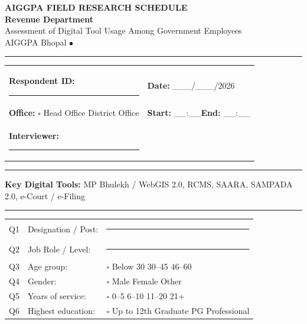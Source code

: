 \documentclass[10pt,a4paper]{article}
\newcommand{\blank}{\rule{8cm}{0.4pt}}
\begin{document}
\begin{center}
{\Large\bfseries AIGGPA FIELD RESEARCH SCHEDULE}\\[3pt]
{\large\bfseries Revenue Department}\\[3pt]
{\small Assessment of Digital Tool Usage Among Government Employees}\\[2pt]
{\small AIGGPA Bhopal \quad$\bullet$}
\end{center}
\vspace{4pt}\noindent\rule{\textwidth}{1pt}\vspace{4pt}
\noindent\begin{tabularx}{\textwidth}{@{}L{7cm} L{7cm}@{}}
\textbf{Respondent ID:} \blank & \textbf{Date:} \_\_\_/\_\_\_/2026 \\[3pt]
\textbf{Office:} {\Large$\square$} Head Office\quad{\Large$\square$} District Office & \textbf{Start:} \_\_:\_\_\quad\textbf{End:} \_\_:\_\_ \\[3pt]
\textbf{Interviewer:} \blank & \\
\end{tabularx}
\vspace{4pt}\noindent\rule{\textwidth}{0.5pt}\vspace{4pt}

\noindent\textbf{Key Digital Tools:} MP Bhulekh / WebGIS 2.0, RCMS, SAARA, SAMPADA 2.0, e-Court / e-Filing

\vspace{3pt}

\vspace{4pt}\noindent\rule{\textwidth}{0.5pt}

\vspace{3pt}
\vspace{4pt}

\noindent\begin{tabularx}{\textwidth}{@{}L{0.6cm} L{7.5cm} X@{}}
Q1 & Designation / Post: & \blank \\[3pt]
Q2 & Job Role / Level: & \blank \\[3pt]
Q3 & Age group: & {\Large$\square$} Below 30\quad{\Large$\square$} 30--45\quad{\Large$\square$} 46--60 \\[3pt]
Q4 & Gender: & {\Large$\square$} Male\quad{\Large$\square$} Female\quad{\Large$\square$} Other \\[3pt]
Q5 & Years of service: & {\Large$\square$} 0--5\quad{\Large$\square$} 6--10\quad{\Large$\square$} 11--20\quad{\Large$\square$} 21+ \\[3pt]
Q6 & Highest education: & {\Large$\square$} Up to 12th\quad{\Large$\square$} Graduate\quad{\Large$\square$} PG\quad{\Large$\square$} Professional \\
\end{tabularx}
\end{document}
